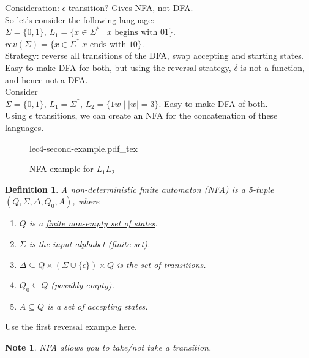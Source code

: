 \documentclass[a4paper]{article}
\newtheorem{defn}{Definition}
\newtheorem{note}{Note}
\newcommand{\incfig}[1]{%
    \def\svgwidth{\columnwidth}
    {#1.pdf_tex}
}
\begin{document}
Consideration: $\epsilon$ transition? Gives NFA, not DFA.\\

So let's consider the following language:\\

$\Sigma = \{0, 1\}$, $L_1 = \{x \in \Sigma^* \mid x \text{ begins with } 01\}$.\\

$rev(\Sigma) = \{x \in \Sigma^* | x \text{ ends with } 10\}$.\\

Strategy: reverse all transitions of the DFA, swap accepting and starting states.
Easy to make DFA for both, but using the reversal strategy, $\delta$ is not a function, and hence not a DFA.\\

Consider \\

$\Sigma = \{0, 1\}$, $L_1 = \Sigma^*$, $L_2 = \{1w \mid |w| = 3\}$.
Easy to make DFA of both.\\

Using $\epsilon$ transitions, we can create an NFA for the concatenation of these languages.\\
\begin{figure}[ht]
    \centering
    \incfig{lec4-second-example}
    \caption{NFA example for $L_1 L_2$}
    \label{fig:lec4-second-example}
\end{figure}


\begin{defn}
    A non-deterministic finite automaton (NFA) is a 5-tuple $(Q, \Sigma, \Delta, Q_0, A)$, where
    \begin{enumerate}
        \item $Q$ is a \underline{finite non-empty set of states}.
        \item $\Sigma$ is the input alphabet (finite set).
        \item $\Delta \subseteq Q \times \left(\Sigma \cup \{\epsilon\}\right) \times Q$ is the \underline{set of transitions}. 
        \item $Q_0 \subseteq Q$ (possibly empty).
        \item $A \subseteq Q$ is a set of accepting states.
    \end{enumerate}
\end{defn}

Use the first reversal example here.

\begin{note}
    NFA allows you to take/not take a transition.
\end{note}
\end{document}
